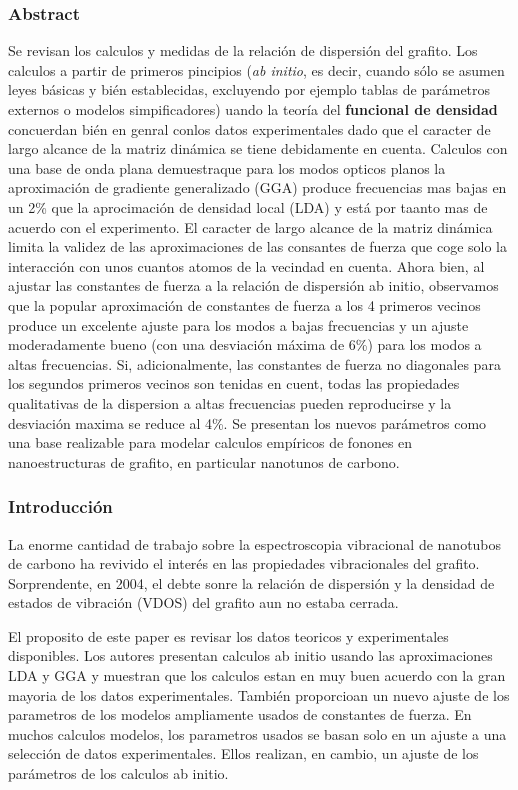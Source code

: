 \documentclass[11pt]{article}
\begin{document}
\subsubsection{Abstract}
\label{sec:org55bd6d8}
Se revisan los calculos y medidas de la relación de dispersión del grafito. Los calculos a partir de  primeros pincipios (\emph{ab initio}, es decir, cuando sólo se asumen leyes básicas y bién establecidas, excluyendo por ejemplo tablas de parámetros externos o modelos simpificadores) uando la teoría del \textbf{funcional de densidad} concuerdan bién en genral conlos datos experimentales dado que el caracter de largo alcance de la matriz dinámica se tiene debidamente en cuenta. Calculos con una base de onda plana demuestraque para los modos opticos planos la aproximación de gradiente generalizado (GGA) produce frecuencias mas bajas en un 2\% que la aprocimación de densidad local (LDA) y está por taanto mas de acuerdo con el experimento. El caracter de largo alcance de la matriz dinámica limita la validez de las aproximaciones de las consantes de fuerza que coge solo la interacción con unos cuantos atomos de la vecindad en cuenta. Ahora bien, al ajustar las constantes de fuerza a la relación de dispersión ab initio, observamos que la popular aproximación de constantes de fuerza a los 4 primeros vecinos produce un excelente ajuste para los modos a bajas frecuencias y un ajuste moderadamente bueno (con una desviación máxima de 6\%) para los modos a altas frecuencias. Si, adicionalmente, las constantes de fuerza no diagonales para los segundos primeros vecinos son tenidas en cuent, todas las propiedades qualitativas de la dispersion a altas frecuencias pueden reproducirse y la desviación maxima se reduce al 4\%. Se presentan los nuevos parámetros como una base realizable para modelar calculos empíricos de fonones en nanoestructuras de grafito, en particular nanotunos de carbono. 
\subsubsection{Introducción}
\label{sec:org5cb5894}
La enorme cantidad de trabajo sobre la espectroscopia vibracional de nanotubos de carbono ha revivido el interés en las propiedades vibracionales del grafito. Sorprendente, en 2004, el debte sonre la relación de dispersión y la densidad de estados de vibración (VDOS) del grafito aun no estaba cerrada.

El proposito de este paper es revisar los datos teoricos y experimentales disponibles. Los autores presentan calculos ab initio usando las aproximaciones LDA y GGA y muestran que los calculos estan en muy buen acuerdo con la gran mayoria de los datos experimentales. También proporcioan un nuevo ajuste de los parametros de los modelos ampliamente usados de constantes de fuerza. En muchos calculos modelos, los parametros usados se basan solo en un ajuste a una selección de datos experimentales. Ellos realizan, en cambio, un ajuste de los parámetros de los calculos ab initio.
\end{document}
